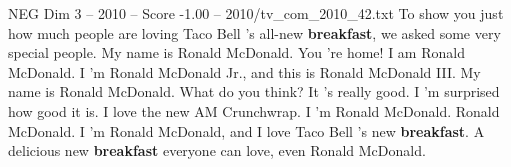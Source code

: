 \begin{textsample}{NEG Dim 3 – 2010 – Score -1.00 – 2010/tv\_com\_2010\_42.txt}  \label{ex:f3_neg_052}
To show you just how much people are loving Taco Bell 's all-new \textbf{breakfast}, we asked some very special people.
My name is Ronald McDonald.
You 're home!
I am Ronald McDonald.
I 'm Ronald McDonald Jr., and this is Ronald McDonald III.
My name is Ronald McDonald.
What do you think?
It 's really good.
I 'm surprised how good it is.
I love the new AM Crunchwrap.
I 'm Ronald McDonald.
Ronald McDonald.
I 'm Ronald McDonald, and I love Taco Bell 's new \textbf{breakfast}.
A delicious new \textbf{breakfast} everyone can love, even Ronald McDonald.

\end{textsample}
